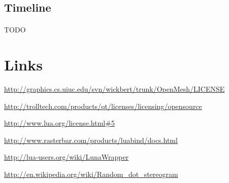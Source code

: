 \documentclass[11pt]{scrartcl}
\begin{document}
\begin{multicols}{2}
\section{Timeline}
\paragraph{}
TODO

\end{multicols}

\appendix

\section{Links}
\url{http://graphics.cs.uiuc.edu/svn/wickbert/trunk/OpenMesh/LICENSE}

\url{http://trolltech.com/products/qt/licenses/licensing/opensource}

\url{http://www.lua.org/license.html#5}

\url{http://www.rasterbar.com/products/luabind/docs.html}

\url{http://lua-users.org/wiki/LunaWrapper}

\url{http://en.wikipedia.org/wiki/Random_dot_stereogram}
\end{document}
